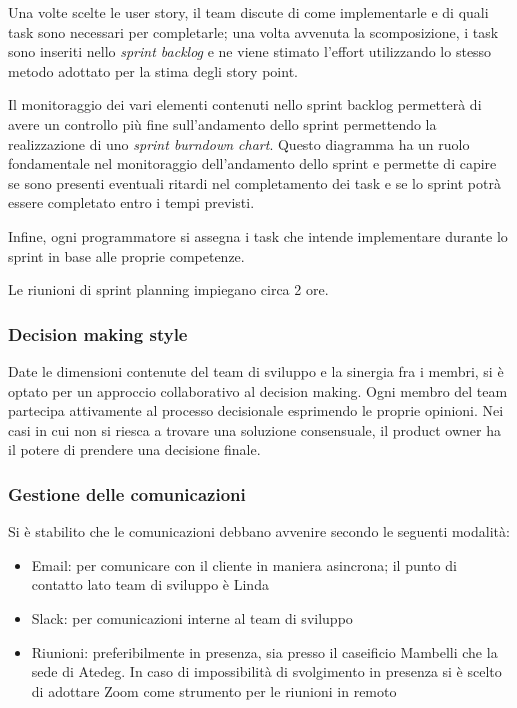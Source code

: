 Una volte scelte le user story, il team discute di come implementarle e di quali task sono necessari per completarle; una volta avvenuta la scomposizione, i task sono inseriti nello \emph{sprint backlog} e ne viene stimato l'effort utilizzando lo stesso metodo adottato per la stima degli story point.

Il monitoraggio dei vari elementi contenuti nello sprint backlog permetterà di avere un controllo più fine sull'andamento dello sprint permettendo la realizzazione di uno \emph{sprint burndown chart}. Questo diagramma ha un ruolo fondamentale nel monitoraggio dell'andamento dello sprint e permette di capire se sono presenti eventuali ritardi nel completamento dei task e se lo sprint potrà essere completato entro i tempi previsti.

Infine, ogni programmatore si assegna i task che intende implementare durante lo sprint in base alle proprie competenze.

Le riunioni di sprint planning impiegano circa 2 ore.

\subsubsection{Decision making style}
Date le dimensioni contenute del team di sviluppo e la sinergia fra i membri, si è optato per un approccio collaborativo al decision making. Ogni membro del team partecipa attivamente al processo decisionale esprimendo le proprie opinioni.
Nei casi in cui non si riesca a trovare una soluzione consensuale, il product owner ha il potere di prendere una decisione finale.

\subsubsection{Gestione delle comunicazioni}
Si è stabilito che le comunicazioni debbano avvenire secondo le seguenti modalità:
\begin{itemize}
  \item Email: per comunicare con il cliente in maniera asincrona; il punto di contatto lato team di sviluppo è Linda
  \item Slack: per comunicazioni interne al team di sviluppo
  \item Riunioni: preferibilmente in presenza, sia presso il caseificio Mambelli che la sede di Atedeg. In caso di impossibilità di svolgimento in presenza si è scelto di adottare Zoom come strumento per le riunioni in remoto
\end{itemize}

